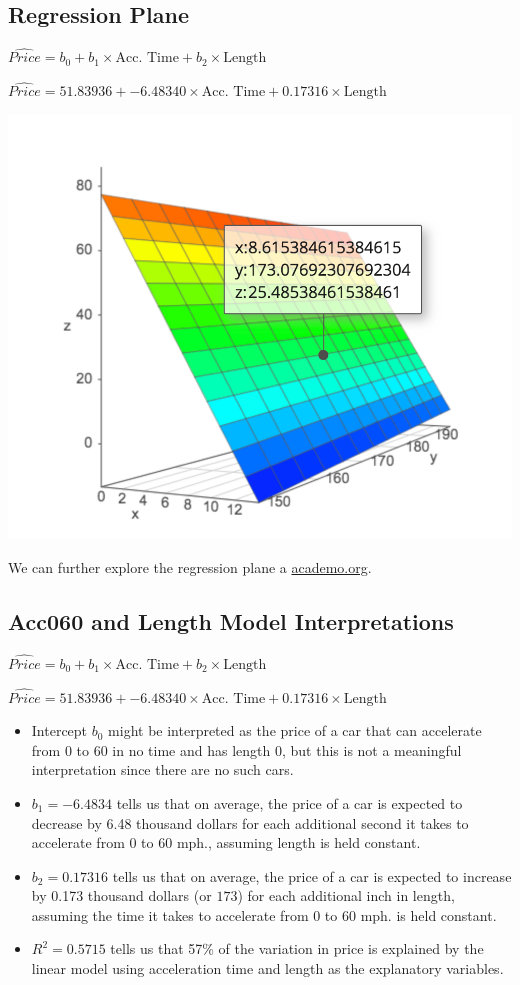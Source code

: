 \documentclass[]{book}
\begin{document}
\subsection{Regression Plane}\label{regression-plane}

\(\widehat{Price} = b_0 + b_1\times\text{Acc. Time} + b_2\times\text{Length}\)

\(\widehat{Price} = 51.83936 + -6.48340\times\text{Acc. Time} + 0.17316\times\text{Length}\)

\includegraphics[width=0.4\linewidth]{Plane}

We can further explore the regression plane a
\href{https://academo.org/demos/3d-surface-plotter/?expression=51.89-6.48*x\%2B0.17*y\&xRange=0\%2C\%2B14\&yRange=150\%2C+200\&resolution=21}{academo.org}.

\subsection{Acc060 and Length Model
Interpretations}\label{acc060-and-length-model-interpretations}

\(\widehat{Price} = b_0 + b_1\times\text{Acc. Time} + b_2\times\text{Length}\)

\(\widehat{Price} = 51.83936 + -6.48340\times\text{Acc. Time} + 0.17316\times\text{Length}\)

\begin{itemize}
\item
  Intercept \(b_0\) might be interpreted as the price of a car that can
  accelerate from 0 to 60 in no time and has length 0, but this is not a
  meaningful interpretation since there are no such cars.
\item
  \(b_1=-6.4834\) tells us that on average, the price of a car is
  expected to decrease by 6.48 thousand dollars for each additional
  second it takes to accelerate from 0 to 60 mph., assuming length is
  held constant.
\item
  \(b_2=0.17316\) tells us that on average, the price of a car is
  expected to increase by 0.173 thousand dollars (or \(173\)) for each
  additional inch in length, assuming the time it takes to accelerate
  from 0 to 60 mph. is held constant.
\item
  \(R^2 = 0.5715\) tells us that 57\% of the variation in price is
  explained by the linear model using acceleration time and length as
  the explanatory variables.
\end{itemize}
\end{document}

